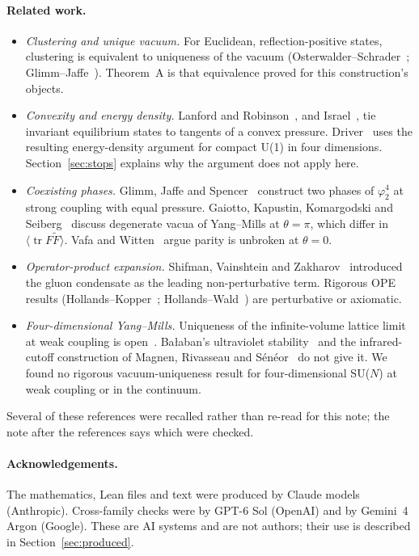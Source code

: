 \documentclass[11pt,a4paper]{article}
\newcommand{\ip}[1]{\langle #1\rangle}
\theoremstyle{plain}
\begin{document}
\paragraph{Related work.}
\begin{itemize}
\item \emph{Clustering and unique vacuum.} For Euclidean, reflection-positive states, clustering is equivalent to uniqueness of the vacuum (Osterwalder--Schrader~\cite{OS}; Glimm--Jaffe~\cite{GlimmJaffe}). Theorem~A is that equivalence proved for this construction's objects.
\item \emph{Convexity and energy density.} Lanford and Robinson~\cite{LanfordRobinson}, and Israel~\cite{Israel}, tie invariant equilibrium states to tangents of a convex pressure. Driver~\cite{Driver} uses the resulting energy-density argument for compact U(1) in four dimensions. Section~\ref{sec:stops} explains why the argument does not apply here.
\item \emph{Coexisting phases.} Glimm, Jaffe and Spencer~\cite{GJS} construct two phases of $\varphi^4_2$ at strong coupling with equal pressure. Gaiotto, Kapustin, Komargodski and Seiberg~\cite{GKKS} discuss degenerate vacua of Yang--Mills at $\theta=\pi$, which differ in $\ip{\operatorname{tr}F\tilde F}$. Vafa and Witten~\cite{VafaWitten} argue parity is unbroken at $\theta=0$.
\item \emph{Operator-product expansion.} Shifman, Vainshtein and Zakharov~\cite{SVZ} introduced the gluon condensate as the leading non-perturbative term. Rigorous OPE results (Hollands--Kopper~\cite{HollandsKopper}; Hollands--Wald~\cite{HollandsWald}) are perturbative or axiomatic.
\item \emph{Four-dimensional Yang--Mills.} Uniqueness of the infinite-volume lattice limit at weak coupling is open~\cite{Chatterjee}. Ba{\l}aban's ultraviolet stability~\cite{Balaban} and the infrared-cutoff construction of Magnen, Rivasseau and S\'en\'eor~\cite{MRS} do not give it. We found no rigorous vacuum-uniqueness result for four-dimensional SU($N$) at weak coupling or in the continuum.
\end{itemize}
Several of these references were recalled rather than re-read for this note; the note after the references says which were checked.

\paragraph{Acknowledgements.} The mathematics, Lean files and text were produced by Claude models (Anthropic). Cross-family checks were by GPT-6 Sol (OpenAI) and by Gemini~4 Argon (Google). These are AI systems and are not authors; their use is described in Section~\ref{sec:produced}.
\end{document}
